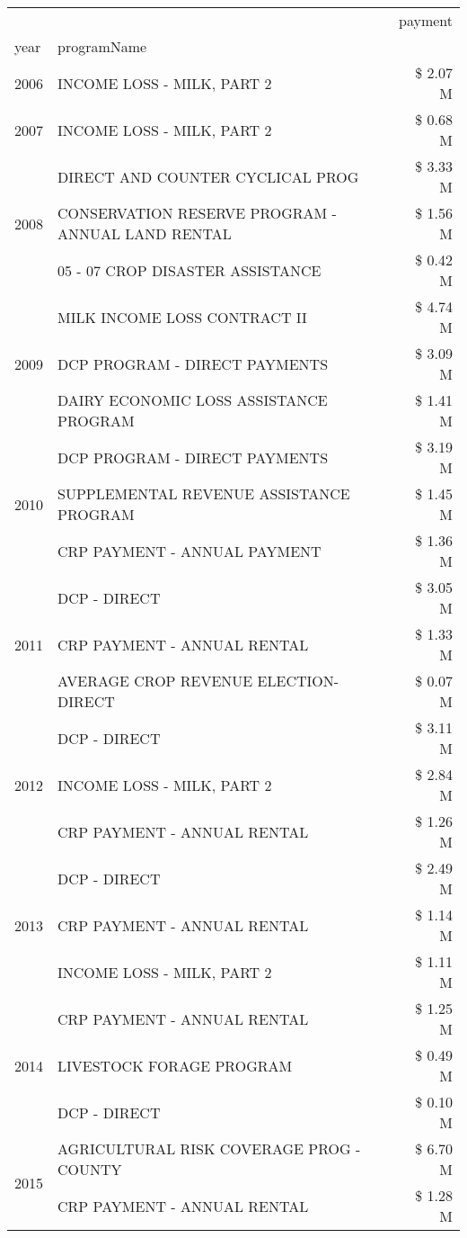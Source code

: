 \begin{tabular}{llr}
\toprule
 &  & payment \\
year & programName &  \\
\midrule
2006 & INCOME LOSS - MILK, PART 2 & \$ 2.07 M \\
\cline{1-3}
2007 & INCOME LOSS - MILK, PART 2 & \$ 0.68 M \\
\cline{1-3}
\multirow[t]{3}{*}{2008} & DIRECT AND COUNTER CYCLICAL PROG & \$ 3.33 M \\
 & CONSERVATION RESERVE PROGRAM - ANNUAL LAND RENTAL & \$ 1.56 M \\
 & 05 - 07 CROP DISASTER ASSISTANCE & \$ 0.42 M \\
\cline{1-3}
\multirow[t]{3}{*}{2009} & MILK INCOME LOSS CONTRACT II & \$ 4.74 M \\
 & DCP PROGRAM - DIRECT PAYMENTS & \$ 3.09 M \\
 & DAIRY ECONOMIC LOSS ASSISTANCE PROGRAM & \$ 1.41 M \\
\cline{1-3}
\multirow[t]{3}{*}{2010} & DCP PROGRAM - DIRECT PAYMENTS & \$ 3.19 M \\
 & SUPPLEMENTAL REVENUE ASSISTANCE PROGRAM & \$ 1.45 M \\
 & CRP PAYMENT - ANNUAL PAYMENT & \$ 1.36 M \\
\cline{1-3}
\multirow[t]{3}{*}{2011} & DCP - DIRECT & \$ 3.05 M \\
 & CRP PAYMENT - ANNUAL RENTAL & \$ 1.33 M \\
 & AVERAGE CROP REVENUE ELECTION-DIRECT & \$ 0.07 M \\
\cline{1-3}
\multirow[t]{3}{*}{2012} & DCP - DIRECT & \$ 3.11 M \\
 & INCOME LOSS - MILK, PART 2 & \$ 2.84 M \\
 & CRP PAYMENT - ANNUAL RENTAL & \$ 1.26 M \\
\cline{1-3}
\multirow[t]{3}{*}{2013} & DCP - DIRECT & \$ 2.49 M \\
 & CRP PAYMENT - ANNUAL RENTAL & \$ 1.14 M \\
 & INCOME LOSS - MILK, PART 2 & \$ 1.11 M \\
\cline{1-3}
\multirow[t]{3}{*}{2014} & CRP PAYMENT - ANNUAL RENTAL & \$ 1.25 M \\
 & LIVESTOCK FORAGE PROGRAM & \$ 0.49 M \\
 & DCP - DIRECT & \$ 0.10 M \\
\cline{1-3}
\multirow[t]{3}{*}{2015} & AGRICULTURAL RISK COVERAGE PROG - COUNTY & \$ 6.70 M \\
 & CRP PAYMENT - ANNUAL RENTAL & \$ 1.28 M \\

\end{tabular}
